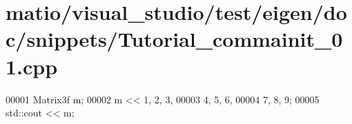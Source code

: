 \hypertarget{matio_2visual__studio_2test_2eigen_2doc_2snippets_2_tutorial__commainit__01_8cpp_source}{}\section{matio/visual\+\_\+studio/test/eigen/doc/snippets/\+Tutorial\+\_\+commainit\+\_\+01.cpp}
\label{matio_2visual__studio_2test_2eigen_2doc_2snippets_2_tutorial__commainit__01_8cpp_source}

\begin{DoxyCode}
00001 Matrix3f m;
00002 m << 1, 2, 3,
00003      4, 5, 6,
00004      7, 8, 9;
00005 std::cout << m;
\end{DoxyCode}
